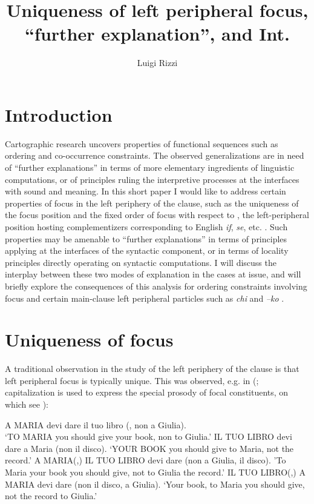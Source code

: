 \documentclass[output=paper]{LSP/langsci}
\author{Luigi Rizzi       	\affiliation{University of Geneva, University of Siena}}
\title{Uniqueness of left peripheral focus, “further explanation”, and Int.}
\begin{document}
 


  
\section{Introduction}


Cartographic research uncovers properties of functional sequences such as ordering and co-occurrence constraints. The observed generalizations are in need of “further explanations” in terms of more elementary ingredients of linguistic computations, or of principles ruling the interpretive processes at the interfaces with sound and meaning. In this short paper I would like to address certain properties of focus in the left periphery of the clause, such as the uniqueness of the focus position and the fixed order of focus with respect to , the left-peripheral position hosting  complementizers corresponding to English \textit{if},  \textit{se}, etc.  \citep{Rizzi2001}. Such properties may be amenable to “further explanations” in terms of principles applying at the interfaces of the syntactic component, or in terms of locality principles directly operating on syntactic computations. I will discuss the interplay between these two modes of explanation in the cases at issue, and will briefly explore the consequences of this analysis for ordering constraints involving focus and certain main-clause left peripheral particles such as  \textit{chi}  \citealt{BianchiCruschina2016} and  \textit{–ko} \citep{Holmberg2013,Holmberg2014finnishquestion}.


\section{Uniqueness of focus}


A traditional observation in the study of the left periphery of the clause is that left peripheral focus is typically unique. This was observed, e.g. in  (\citealt{Rizzi1997}; capitalization is used to express the special prosody of focal constituents, on which see \citealt{Bocci2013}):

\ea%
    \label{ex:rizzi:1}
\ea  \label{ex:rizzi:1a}
       A MARIA devi dare il tuo libro {\longrule} (, non a Giulia).\\ 
  \glt ‘TO MARIA you should give your book, non to Giulia.’
    \ex  \label{ex:rizzi:1b} IL TUO LIBRO devi dare {\longrule} a Maria (non il disco).
\glt ‘YOUR BOOK you should give to Maria, not the record.’
\ex * A MARIA(,) IL TUO LIBRO   devi dare (non a Giulia, il disco).
\glt  'To Maria   your book   you should give, not to Giulia the record.'
\ex * IL TUO LIBRO(,) A MARIA devi dare (non il disco, a Giulia).
\glt     ‘Your book, to Maria you should give, not the record to Giulia.’
\z
\z
\end{document}
